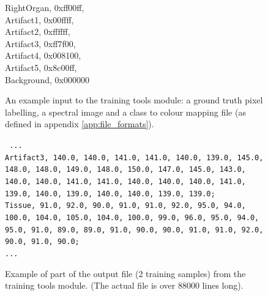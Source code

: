 \documentclass[12pt,twoside,notitlepage]{report}
\begin{document}
\begin{figure}
\begin{framed}
{                    RightOrgan, 0xff00ff,   \\
                    Artifact1, 0x00ffff,    \\
                    Artifact2, 0xffffff,    \\
                    Artifact3, 0xff7f00,    \\
                    Artifact4, 0x008100,    \\
                    Artifact5, 0x8c00ff,    \\
                    Background, 0x000000    \\
                } 
            \end{framed}
            \caption{An example input to the training tools module: a ground truth pixel labelling, a spectral image 
            and a class to colour mapping file (as defined in appendix \ref{app:file_formats}).}
        \end{figure}

        \begin{figure}
            \begin{framed}
                {\tt
                  ... \\
                  Artifact3, 140.0, 140.0, 141.0, 141.0, 140.0, 139.0, 145.0, 148.0, 148.0, 149.0, 148.0, 150.0, 147.0, 145.0, 143.0, 140.0, 140.0, 141.0, 141.0, 140.0, 140.0, 140.0, 141.0, 139.0, 140.0, 139.0, 140.0, 140.0, 139.0, 139.0; \\
                  Tissue, 91.0, 92.0, 90.0, 91.0, 91.0, 92.0, 95.0, 94.0, 100.0, 104.0, 105.0, 104.0, 100.0, 99.0, 96.0, 95.0, 94.0, 95.0, 91.0, 89.0, 89.0, 91.0, 90.0, 90.0, 91.0, 91.0, 92.0, 90.0, 91.0, 90.0; \\
                  ... 
                } 
            \end{framed}
            \caption{Example of part of the output file (2 training samples) from the training tools module. 
            (The actual file is over 88000 lines long).}
        \end{figure}
\end{document}
